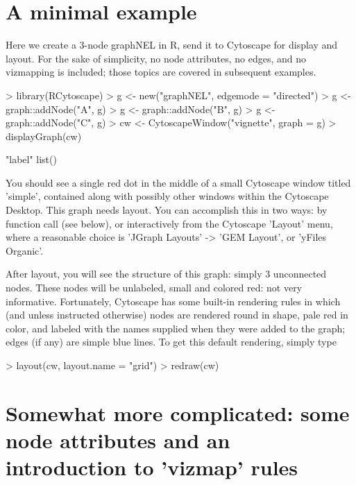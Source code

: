 \documentclass[12pt]{article}
\begin{document}
\section{A minimal example}

Here we create a 3-node graphNEL in R, send it to Cytoscape for display and layout.  For the sake of simplicity, no node attributes, no edges, and no vizmapping is included; those topics are covered in subsequent examples.

\begin{Schunk}
\begin{Sinput}
> library(RCytoscape)
> g <- new("graphNEL", edgemode = "directed")
> g <- graph::addNode("A", g)
> g <- graph::addNode("B", g)
> g <- graph::addNode("C", g)
> cw <- CytoscapeWindow("vignette", graph = g)
> displayGraph(cw)
\end{Sinput}
\begin{Soutput}
[1] "label"
list()
\end{Soutput}
\end{Schunk}

You should see a single red dot in the middle of a small Cytoscape window titled 'simple', contained along with possibly
other windows within the Cytoscape Desktop.  This graph needs layout.  You can accomplish this in two ways:  by function call (see below), or interactively from the Cytoscape 'Layout' menu, where a reasonable choice is 'JGraph Layouts' -> 'GEM Layout', or 'yFiles Organic'.

After layout, you will see the structure of this graph:  simply 3 unconnected nodes.  These nodes will be unlabeled, small and colored red: not very informative.  Fortunately, Cytoscape has some built-in rendering rules in which (and unless instructed otherwise) nodes are rendered round in shape, pale red in color, and labeled with the names supplied when they were added to the graph;  edges (if any) are simple blue lines. To get this default rendering, simply type

\begin{Schunk}
\begin{Sinput}
> layout(cw, layout.name = "grid")
> redraw(cw)
\end{Sinput}
\end{Schunk}

\section{Somewhat more complicated:  some node attributes and an introduction to 'vizmap' rules}
\end{document}
